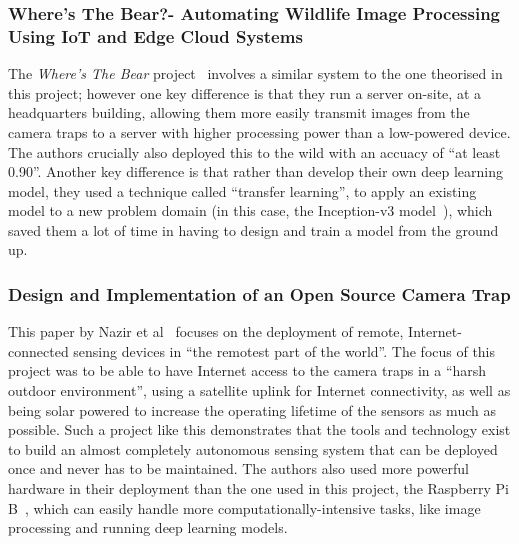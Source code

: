 \subsubsection{Where’s The Bear?- Automating Wildlife Image Processing
Using IoT and Edge Cloud Systems}
The \textit{Where's The Bear} project~\cite{elias2017s} involves a similar
system to the one theorised in this project; however one key difference is
that they run a server on-site, at a headquarters building, allowing them
more easily transmit images from the camera traps to a server with higher
processing power than a low-powered device. The authors crucially also
deployed this to the wild with an accuacy of ``at least 0.90''. Another key
difference is that rather than develop their own deep learning model, they
used a technique called ``transfer learning'', to apply an existing model to
a new problem domain (in this case, the Inception-v3
model~\cite{szegedy2016rethinking}), which saved them a lot of time in having
to design and train a model from the ground up.

\subsubsection{Design and Implementation of an Open Source Camera Trap}
This paper by Nazir et al~\cite{nazir2014design} focuses on the deployment of
remote, Internet-connected sensing devices in ``the remotest part of the
world''. The focus of this project was to be able to have Internet access to
the camera traps in a ``harsh outdoor environment'', using a satellite uplink
for Internet connectivity, as well as being solar powered to increase the
operating lifetime of the sensors as much as possible. Such a project like
this demonstrates that the tools and technology exist to build an almost
completely autonomous sensing system that can be deployed once and never has
to be maintained. The authors also used more powerful hardware in their
deployment than the one used in this project, the Raspberry Pi
B~\cite{raspberrypib}, which can easily handle more computationally-intensive
tasks, like image processing and running deep learning models.